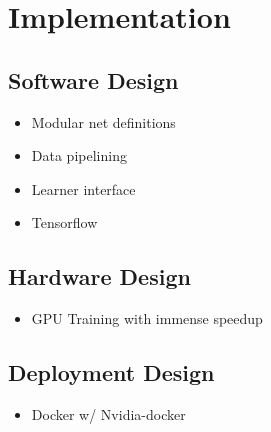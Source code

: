 \section{Implementation}

\subsection{Software Design}

\begin{itemize}
	\item Modular net definitions
	\item Data pipelining
	\item Learner interface
	\item Tensorflow
\end{itemize}

\subsection{Hardware Design}

\begin{itemize}
	\item GPU Training with immense speedup
\end{itemize}

\subsection{Deployment Design}

\begin{itemize}
	\item Docker w/ Nvidia-docker
\end{itemize}